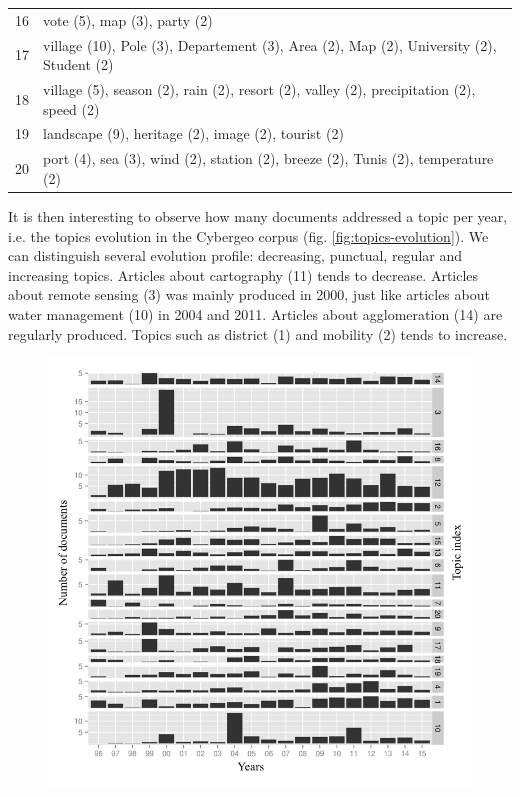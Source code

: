 {\begin{table}
\begin{tabular}{c|p{65mm}}
  16 & vote (5), map (3), party (2) \\
  17 & village (10), Pole (3), Departement (3), Area (2), Map (2), University (2), Student (2) \\
  18 & village (5), season (2), rain (2), resort (2), valley (2), precipitation (2), speed (2) \\
  19 & landscape (9), heritage (2), image (2), tourist (2) \\
  20 & port (4), sea (3), wind (2), station (2), breeze (2), Tunis (2), temperature (2) \\
\end{tabular}
\end{table}
It is then interesting to observe how many documents addressed a topic per year, i.e. the topics evolution in the Cybergeo corpus (fig. \ref{fig:topics-evolution}). We can distinguish several evolution profile: decreasing, punctual, regular and increasing topics. Articles about cartography (11) tends to decrease. Articles about remote sensing (3) was mainly produced in 2000, just like articles about water management (10) in 2004 and 2011. Articles about agglomeration (14) are regularly produced. Topics such as district (1) and mobility (2) tends to increase.
}{

}



\begin{figure}%
\includegraphics[width=\linewidth]{Figures/CybergeoNetworks/evolution.png} 
\end{figure} 


